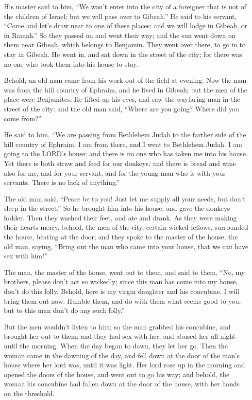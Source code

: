  His master said to him, ``We won't enter into the city
of a foreigner that is not of the children of Israel; but we will pass
over to Gibeah.''  He said to his servant, ``Come and
let's draw near to one of these places; and we will lodge in Gibeah, or
in Ramah.''  So they passed on and went their way; and
the sun went down on them near Gibeah, which belongs to Benjamin.
 They went over there, to go in to stay in Gibeah. He
went in, and sat down in the street of the city; for there was no one
who took them into his house to stay.

 Behold, an old man came from his work out of the field
at evening. Now the man was from the hill country of Ephraim, and he
lived in Gibeah; but the men of the place were Benjamites.
 He lifted up his eyes, and saw the wayfaring man in the
street of the city; and the old man said, ``Where are you going? Where
did you come from?''

 He said to him, ``We are passing from Bethlehem Judah to
the farther side of the hill country of Ephraim. I am from there, and I
went to Bethlehem Judah. I am going to the LORD's house; and there is no
one who has taken me into his house.  Yet there is both
straw and feed for our donkeys; and there is bread and wine also for me,
and for your servant, and for the young man who is with your servants.
There is no lack of anything.''

 The old man said, ``Peace be to you! Just let me supply
all your needs, but don't sleep in the street.''  So he
brought him into his house, and gave the donkeys fodder. Then they
washed their feet, and ate and drank.  As they were
making their hearts merry, behold, the men of the city, certain wicked
fellows, surrounded the house, beating at the door; and they spoke to
the master of the house, the old man, saying, ``Bring out the man who
came into your house, that we can have sex with him!''

 The man, the master of the house, went out to them, and
said to them, ``No, my brothers, please don't act so wickedly; since
this man has come into my house, don't do this folly. 
Behold, here is my virgin daughter and his concubine. I will bring them
out now. Humble them, and do with them what seems good to you; but to
this man don't do any such folly.''

 But the men wouldn't listen to him; so the man grabbed
his concubine, and brought her out to them; and they had sex with her,
and abused her all night until the morning. When the day began to dawn,
they let her go.  Then the woman came in the dawning of
the day, and fell down at the door of the man's house where her lord
was, until it was light.  Her lord rose up in the morning
and opened the doors of the house, and went out to go his way; and
behold, the woman his concubine had fallen down at the door of the
house, with her hands on the threshold.

